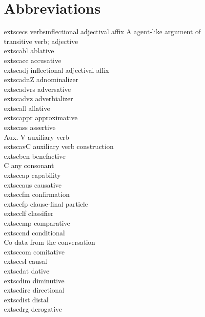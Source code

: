 \section*{Abbreviations}\enlargethispage{\baselineskip}
\begin{multicols}{2}
\begin{tabbing}
	extsc{ecs} verbs\=inflectional adjectival affix\kill
A \>  agent-like argument of \\ \> transitive verb; adjective \\
	extsc{abl} \>  ablative \\
	extsc{acc} \>  accusative \\
	extsc{adj} \>  inflectional adjectival affix \\
	extsc{adn}Z \>  adnominalizer \\
	extsc{advrs} \>  adversative \\
	extsc{advz} \>  adverbializer \\
	extsc{all} \>  allative \\
	extsc{appr} \>  approximative \\
	extsc{ass} \>  assertive \\
Aux. V \>  auxiliary verb \\
	extsc{av}C \>  auxiliary verb construction \\
	extsc{ben} \>  benefactive \\
C \>  any consonant \\
	extsc{cap} \>  capability \\
	extsc{caus} \>  causative \\
	extsc{cfm} \>  confirmation \\
	extsc{cfp} \>  clause-final particle \\
	extsc{clf} \>  classifier \\
	extsc{cmp} \>  comparative \\
	extsc{cnd} \>  conditional \\
Co \>  data from the conversation \\
	extsc{com} \>  comitative \\
	extsc{csl} \>  causal \\
	extsc{dat} \>  dative \\
	extsc{dim} \>  diminutive \\
	extsc{dirc} \>  directional \\
	extsc{dist} \>  distal \\
	extsc{drg} \>  derogative \\

\end{tabbing}
\end{multicols}
